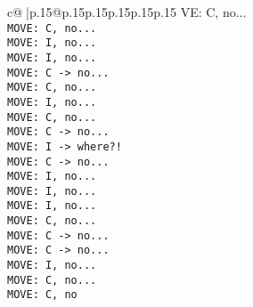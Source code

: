 \documentclass{article}
\begin{document}
{\begin{supertabular}{c@{$\;$}|p{.15\linewidth}@{}p{.15\linewidth}p{.15\linewidth}p{.15\linewidth}p{.15\linewidth}p{.15\linewidth}}
{{{VE: C, no...\\ \tt  MOVE: C, no...\\ \tt  MOVE: I, no...\\ \tt  MOVE: I, no...\\ \tt  MOVE: C -> no...\\ \tt  MOVE: C, no...\\ \tt  MOVE: I, no...\\ \tt  MOVE: C, no...\\ \tt  MOVE: C -> no...\\ \tt  MOVE: I -> where?!\\ \tt  MOVE: C -> no...\\ \tt  MOVE: I, no...\\ \tt  MOVE: I, no...\\ \tt  MOVE: I, no...\\ \tt  MOVE: C, no...\\ \tt  MOVE: C -> no...\\ \tt  MOVE: C -> no...\\ \tt  MOVE: I, no...\\ \tt  MOVE: C, no...\\ \tt  MOVE: C, no}}}
\end{supertabular}}
\end{document}
